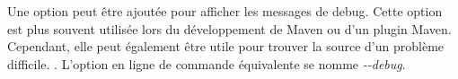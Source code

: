 \begin{minipage}{\linewidth}
\label{fig:maven_window}
\end{minipage}

Une option peut être ajoutée pour afficher les messages de debug. Cette option est plus souvent utilisée lors du développement de Maven ou d'un plugin Maven. Cependant, elle peut également être utile pour trouver la source d'un problème difficile. . L'option en ligne de commande équivalente se nomme \textit{-{}-debug}.